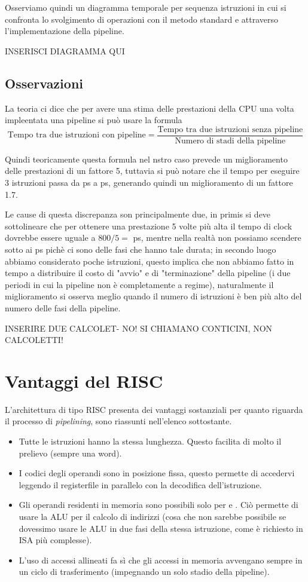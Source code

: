 \documentclass[class=book, crop=false, oneside]{standalone}
\begin{document}
Osserviamo quindi un diagramma temporale per sequenza istruzioni in cui si confronta lo svolgimento di operazioni con il metodo standard e attraverso l'implementazione della pipeline.

INSERISCI DIAGRAMMA QUI


\subsection{Osservazioni}
La teoria ci dice che per avere una stima delle prestazioni della CPU una volta impleentata una pipeline si può usare la formula \[\text{Tempo tra due istruzioni con pipeline} = \frac{\text{Tempo tra due istruzioni senza pipeline}}{\text{Numero di stadi della pipeline}}\]

Quindi teoricamente questa formula nel nstro caso prevede un miglioramento delle prestazioni di un fattore 5, tuttavia si può notare che il tempo per eseguire 3 istruzioni passa da \unit[2400]{ps} a \unit[1400]{ps}, generando quindi un miglioramento di un fattore 1.7.

Le cause di questa discrepanza son principalmente due, in primis si deve sottolineare che per ottenere una prestazione 5 volte più alta il tempo di clock dovrebbe essere uguale a \(800/5=\) \unit[160]{ps}, mentre nella realtà non possiamo scendere sotto ai \unit[200]{ps} pichè ci sono delle fasi che hanno tale durata; in secondo luogo abbiamo considerato poche istruzioni, questo implica che non abbiamo fatto in tempo a distribuire il costo di "avvio" e di "terminazione" della pipeline (i due periodi in cui la pipeline non è completamente a regime), naturalmente il miglioramento si osserva meglio quando il numero di istruzioni è ben più alto del numero delle fasi della pipeline.

INSERIRE DUE CALCOLET- NO! SI CHIAMANO CONTICINI, NON CALCOLETTI!



\section{Vantaggi del RISC}
L'architettura di tipo RISC presenta dei vantaggi sostanziali per quanto riguarda il processo di \emph{pipelining}, sono riassunti nell'elenco sottostante.
\begin{itemize}
	\item Tutte le istruzioni hanno la stessa lunghezza. Questo facilita di molto il prelievo (sempre una word).
	\item I codici degli operandi sono in posizione fissa, questo permette di accedervi leggendo il registerfile in parallelo con la decodifica dell’istruzione.
	\item Gli operandi residenti in memoria sono possibili solo per  e . Ciò permette di usare la ALU per il calcolo di indirizzi (cosa che non sarebbe possibile se dovessimo usare le ALU in due fasi della stessa istruzione, come è richiesto in ISA più complesse).
	\item  L’uso di accessi allineati fa sì che gli accessi in memoria avvengano sempre in un ciclo di trasferimento (impegnando un solo stadio della pipeline).
\end{itemize}
\end{document}
